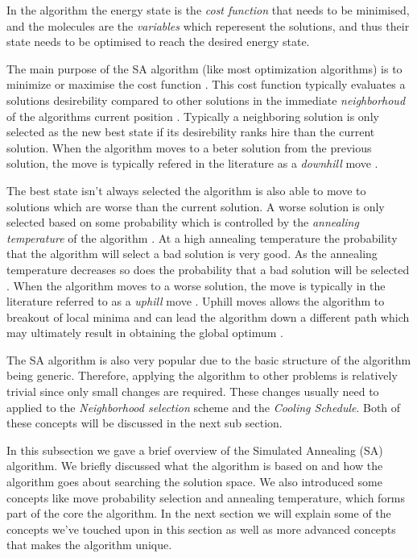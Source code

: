 In the algorithm the energy state is the \emph{cost function} that needs to be minimised, and the molecules are the \emph{variables} which reperesent the solutions, and thus their state needs to be optimised to reach the desired energy state.

The main purpose of the SA algorithm (like most optimization algorithms) is to minimize or maximise the cost function \cite{SASingleMultiObj}. This cost function typically evaluates a solutions desirebility compared to other solutions in the immediate \emph{neighborhoud} of the algorithms current position \cite{TheoPraticalSA}. Typically a neighboring solution is only selected as the new best state if its desirebility ranks hire than the current solution. When the algorithm moves to a beter solution from the previous solution, the move is typically refered in the literature as a \emph{downhill} move \cite{CurveFittingSA}.

The best state isn't always selected the algorithm is also able to move to solutions which are worse than the current solution. A worse solution is only selected based on some probability which is controlled by the \emph{annealing temperature} of the algorithm \cite{TheoPraticalSA}. At a high annealing temperature the probability that the algorithm will select a bad solution is very good. As the annealing temperature decreases so does the probability that a bad solution will be selected \cite{CurveFittingSA}. When the algorithm moves to a worse solution, the move is typically in the literature referred to as a \emph{uphill} move \cite{CurveFittingSA}. Uphill moves allows the algorithm to breakout of local minima and can lead the algorithm down a different path which may ultimately result in obtaining the global optimum \cite{SASingleMultiObj}. 

The SA algorithm is also very popular due to the basic structure of the algorithm being generic\cite{VariousCoolingSA}. Therefore, applying the algorithm to other problems is relatively trivial since only small changes are required. These changes usually need to applied to the \emph{Neighborhood selection} scheme and the \emph{Cooling Schedule}\cite{VariousCoolingSA}. Both of these concepts will be discussed in the next sub section.

In this subsection we gave a brief overview of the Simulated Annealing (SA) algorithm. We briefly discussed what the algorithm is based on and how the algorithm goes about searching the solution space. We also introduced some concepts like move probability selection and annealing temperature, which forms part of the core the algorithm. In the next section we will explain some of the concepts we've touched upon in this section as well as more advanced concepts that makes the algorithm unique.
